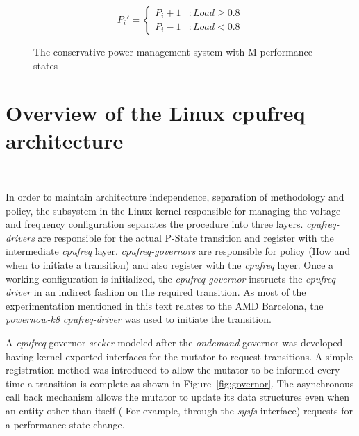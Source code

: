 \begin{figure}[h!]
\centering
\begin{equation*}
    P_{i}' = \left\{ \begin{array}{lr} 
                   P_{i}+1 & : Load \geq 0.8 \\
		   P_{i}-1 & : Load < 0.8
                  \end{array} \right.
\end{equation*}
\caption{The conservative power management system with M performance states}
\label{fig:math_conservative}
\end{figure}

\section{Overview of the Linux cpufreq architecture}~\label{sec:cpufreq}

In order to maintain architecture independence, separation of methodology 
and policy, the subsystem in the Linux kernel responsible for managing the 
voltage and frequency configuration separates the procedure into three layers. \textit{cpufreq-drivers}
are responsible for the actual P-State transition and register with the 
intermediate \textit{cpufreq} layer. \textit{cpufreq-governors} are responsible for
policy (How and when to initiate a transition) and also register with the 
\textit{cpufreq} layer. Once a working configuration is initialized, the 
\textit{cpufreq-governor} instructs the \textit{cpufreq-driver} in an indirect
fashion on the required transition. As most of the experimentation mentioned in
this text relates to the AMD Barcelona, the \textit{powernow-k8} \textit{cpufreq-driver}
was used to initiate the transition. 

A \textit{cpufreq} governor \textit{seeker} modeled after the \textit{ondemand} governor
was developed having kernel exported interfaces for the mutator to request transitions. 
A simple registration method was introduced to allow the mutator to be informed 
every time a transition is complete as shown in Figure~\ref{fig:governor}. 
The asynchronous call back mechanism allows the mutator to
update its data structures even when an entity other than itself ( For example, through
the \textit{sysfs} interface) requests for a performance state change. 


